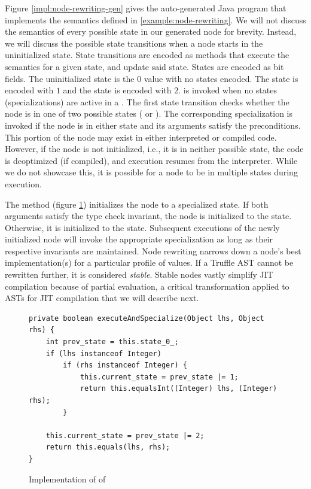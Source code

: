Figure \ref{impl:node-rewriting-gen} gives the auto-generated Java program that implements the semantics defined in \ref{example:node-rewriting}.
We will not discuss the semantics of every possible state in our generated node for brevity.
Instead, we will discuss the possible state transitions when a node starts in the uninitialized state.
State transitions are encoded as methods that execute the semantics for a given state, and update said state.
States are encoded as bit fields.
The uninitialized state is the $0$ value with no states encoded.
The  state is encoded with $1$ and the  state is encoded with $2$.
 is invoked when no states (specializations) are active in a .
The first state transition checks whether the node is in one of two possible states ( or ).
The corresponding specialization is invoked if the node is in either state and its arguments satisfy the preconditions.
This portion of the node may exist in either interpreted or compiled code.
However, if the node is not initialized, i.e., it is in neither possible state, the code is deoptimized (if compiled), and execution resumes from the interpreter.
While we do not showcase this, it is possible for a node to be in multiple states during execution.

The  method (figure \ref{impl:node-rewriting-specialize}) initializes the node to a specialized state.
If both arguments satisfy the  type check invariant, the node is initialized to the  state.
Otherwise, it is initialized to the  state.
Subsequent executions of the newly initialized node will invoke the appropriate specialization as long as their respective invariants are maintained.
Node rewriting narrows down a node's best implementation(s) for a particular profile of values.
If a Truffle AST cannot be rewritten further, it is considered \textit{stable}.
Stable nodes vastly simplify JIT compilation because of partial evaluation, a critical transformation applied to ASTs for JIT compilation that we will describe next.

\begin{figure}[!htb]
\begin{verbatim}
private boolean executeAndSpecialize(Object lhs, Object rhs) {
	int prev_state = this.state_0_;
	if (lhs instanceof Integer) 
		if (rhs instanceof Integer) {
			this.current_state = prev_state |= 1;
			return this.equalsInt((Integer) lhs, (Integer) rhs);
		}

	this.current_state = prev_state |= 2;
	return this.equals(lhs, rhs);
}
\end{verbatim}
\caption{Implementation of  of }
\label{impl:node-rewriting-specialize}
\end{figure}


